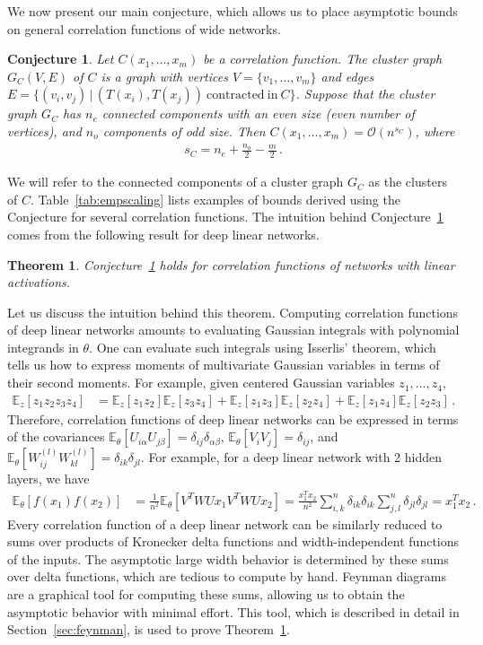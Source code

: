 \documentclass[english]{article}
\newtheorem{thm}{Theorem}
\newtheorem{conjecture}{Conjecture}
\newcommand{\cO}{\ensuremath{\mathcal{O}}}
\newcommand{\lexpp}[1]{\mathbb{E}_{#1}\left[}
\newcommand{\rexp}{\right]}
\begin{document}
We now present our main conjecture, which allows us to place asymptotic bounds on general correlation functions of wide networks.
\begin{conjecture}\label{conj:main}
  Let $C(x_1,\dots,x_m)$ be a correlation function.
  The \emph{cluster graph} $G_C(V,E)$ of $C$ is a graph with vertices $V=\{v_1,\dots,v_m\}$ and edges $E=\{(v_i,v_j) \,|\, (T(x_i),T(x_j))\mathrm{~contracted~in~ }C\}$.
  Suppose that the cluster graph $G_C$ has $n_e$ connected components with an even size (even number of vertices), and $n_o$ components of odd size.
  Then $C(x_1,\dots,x_m) = \cO(n^{s_C})$, where
  \begin{align}
    s_C = n_e + \frac{n_o}{2} - \frac{m}{2} \,. \label{eq:s}
  \end{align}
\end{conjecture}
We will refer to the connected components of a cluster graph $G_C$ as the clusters of $C$.
Table~\ref{tab:empscaling} lists examples of bounds derived using the Conjecture for several correlation functions.
The intuition behind Conjecture~\ref{conj:main} comes from the following result for deep linear networks.
\begin{thm}\label{thm:main}
  Conjecture~\ref{conj:main} holds for correlation functions of networks with linear activations.
\end{thm}
Let us discuss the intuition behind this theorem.
Computing correlation functions of deep linear networks amounts to evaluating Gaussian integrals with polynomial integrands in $\theta$.
One can evaluate such integrals using Isserlis' theorem, which tells us how to express moments of multivariate Gaussian variables in terms of their second moments.
For example, given centered Gaussian variables $z_1,...,z_4$,
\begin{align}
  \lexpp{z} z_1 z_2 z_3 z_4 \rexp &=
  \lexpp{z} z_1 z_2 \rexp \lexpp{z} z_3 z_4 \rexp +
  \lexpp{z} z_1 z_3 \rexp \lexpp{z} z_2 z_4 \rexp +
  \lexpp{z} z_1 z_4 \rexp \lexpp{z} z_2 z_3 \rexp \,.
\end{align}
Therefore, correlation functions of deep linear networks can be expressed in terms of the covariances $\lexpp{\theta} U_{i\alpha} U_{j\beta} \rexp = \delta_{ij} \delta_{\alpha\beta}$, $\lexpp{\theta} V_i V_j \rexp = \delta_{ij}$, and $\lexpp{\theta} W_{ij}^{(l)} W_{kl}^{(l)} \rexp = \delta_{ik} \delta_{jl}$.
For example, for a deep linear network with 2 hidden layers, we have
\begin{align}
  \lexpp{\theta} f(x_1) f(x_2) \rexp
  &= \frac{1}{n^2} \lexpp{\theta} V^T W U x_1 V^T W U x_2 \rexp
  =
  \frac{x_1^T x_2}{n^2} \sum_{i,k}^n \delta_{ik} \delta_{ik} \sum_{j,l}^n \delta_{jl} \delta_{jl}
  = x_1^T x_2
  \,.
\end{align}
Every correlation function of a deep linear network can be similarly reduced to sums over products of Kronecker delta functions and width-independent functions of the inputs.
The asymptotic large width behavior is determined by these sums over delta functions, which are tedious to compute by hand.
Feynman diagrams are a graphical tool for computing these sums, allowing us to obtain the asymptotic behavior with minimal effort.
This tool, which is described in detail in Section~\ref{sec:feynman}, is used to prove Theorem~\ref{thm:main}.
\end{document}
